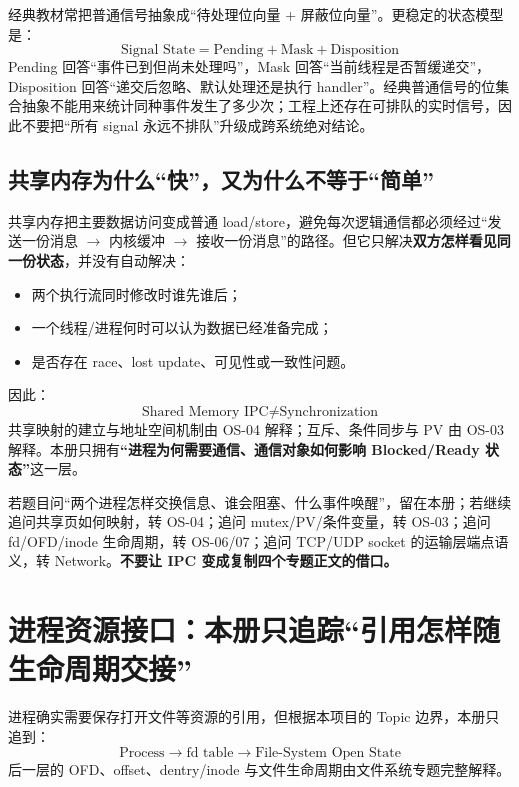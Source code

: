 \documentclass[11pt,a4paper]{ctexart}
\newcommand{\kw}[1]{\textbf{#1}}
\begin{document}
\begin{exam}
经典教材常把普通信号抽象成“待处理位向量 + 屏蔽位向量”。更稳定的状态模型是：
\[
\boxed{\text{Signal State}=\text{Pending}+\text{Mask}+\text{Disposition}}
\]
Pending 回答“事件已到但尚未处理吗”，Mask 回答“当前线程是否暂缓递交”，Disposition 回答“递交后忽略、默认处理还是执行 handler”。经典普通信号的位集合抽象不能用来统计同种事件发生了多少次；工程上还存在可排队的实时信号，因此不要把“所有 signal 永远不排队”升级成跨系统绝对结论。
\end{exam}

\subsection{共享内存为什么“快”，又为什么不等于“简单”}

共享内存把主要数据访问变成普通 load/store，避免每次逻辑通信都必须经过“发送一份消息 $\to$ 内核缓冲 $\to$ 接收一份消息”的路径。但它只解决\kw{双方怎样看见同一份状态}，并没有自动解决：
\begin{itemize}
\item 两个执行流同时修改时谁先谁后；
\item 一个线程/进程何时可以认为数据已经准备完成；
\item 是否存在 race、lost update、可见性或一致性问题。
\end{itemize}
因此：
\[
\boxed{\text{Shared Memory IPC}\neq\text{Synchronization}}
\]
共享映射的建立与地址空间机制由 OS-04 解释；互斥、条件同步与 PV 由 OS-03 解释。本册只拥有\kw{“进程为何需要通信、通信对象如何影响 Blocked/Ready 状态”}这一层。

\begin{method}
若题目问“两个进程怎样交换信息、谁会阻塞、什么事件唤醒”，留在本册；若继续追问共享页如何映射，转 OS-04；追问 mutex/PV/条件变量，转 OS-03；追问 fd/OFD/inode 生命周期，转 OS-06/07；追问 TCP/UDP socket 的运输层端点语义，转 Network。\kw{不要让 IPC 变成复制四个专题正文的借口。}
\end{method}

\section{进程资源接口：本册只追踪“引用怎样随生命周期交接”}

进程确实需要保存打开文件等资源的引用，但根据本项目的 Topic 边界，本册只追到：
\[
\boxed{\text{Process}\rightarrow\text{fd table}\rightarrow\text{File-System Open State}}
\]
后一层的 OFD、offset、dentry/inode 与文件生命周期由文件系统专题完整解释。
\end{document}
